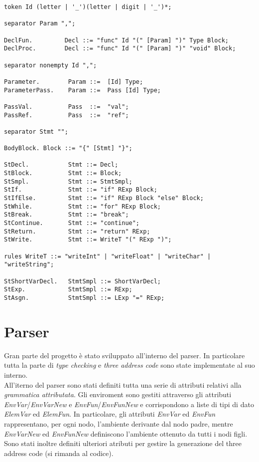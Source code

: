 \documentclass[12pt]{article}
\begin{document}
\begin{verbatim}
token Id (letter | '_')(letter | digit | '_')*;

separator Param ",";

DeclFun.         Decl ::= "func" Id "(" [Param] ")" Type Block;
DeclProc.        Decl ::= "func" Id "(" [Param] ")" "void" Block;

separator nonempty Id ",";

Parameter.        Param ::=  [Id] Type;
ParameterPass.    Param ::=  Pass [Id] Type;

PassVal.          Pass  ::=  "val";
PassRef.          Pass  ::=  "ref";

separator Stmt "";

BodyBlock. Block ::= "{" [Stmt] "}";

StDecl.           Stmt ::= Decl;
StBlock.          Stmt ::= Block;
StSmpl.           Stmt ::= StmtSmpl;
StIf.             Stmt ::= "if" RExp Block;
StIfElse.         Stmt ::= "if" RExp Block "else" Block;
StWhile.          Stmt ::= "for" RExp Block;
StBreak.          Stmt ::= "break"; 
StContinue.       Stmt ::= "continue";
StReturn.         Stmt ::= "return" RExp;
StWrite.          Stmt ::= WriteT "(" RExp ")";

rules WriteT ::= "writeInt" | "writeFloat" | "writeChar" | "writeString";

StShortVarDecl.   StmtSmpl ::= ShortVarDecl;
StExp.            StmtSmpl ::= RExp;
StAsgn.           StmtSmpl ::= LExp "=" RExp;
\end{verbatim}

\section{Parser}
Gran parte del progetto è stato sviluppato all'interno del parser. In particolare tutta la parte di \textit{type checking} e \textit{three address code} sono state implementate al suo interno.\\
All'iterno del parser sono stati definiti tutta una serie di attributi relativi alla \textit{grammatica attributata}.
Gli enviroment sono gestiti attraverso gli attributi \textit{EnvVar}/\textit{EnvVarNew} e \textit{EnvFun}/\textit{EnvFunNew} e corrispondono a liste di tipi di dato \textit{ElemVar} ed \textit{ElemFun}. In particolare, gli attributi \textit{EnvVar} ed \textit{EnvFun} rappresentano, per ogni nodo, l'ambiente  derivante dal nodo padre, mentre \textit{EnvVarNew} ed \textit{EnvFunNew} definiscono l'ambiente ottenuto da tutti i nodi figli.
Sono stati inoltre definiti ulteriori atributi per gestire la generazione del three address code (si rimanda al codice).
\end{document}
